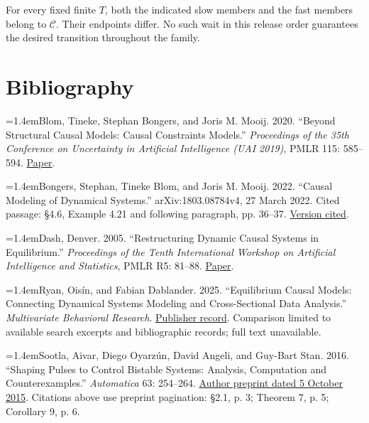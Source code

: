 For every fixed finite \(T\), both the indicated slow members and the fast members belong to \(\mathcal C\). Their endpoints differ. No such wait in this release order guarantees the desired transition throughout the family.

\enlargethispage{2\baselineskip}\section*{Bibliography}\begingroup\fontsize{10}{13}\selectfont\setlength{\parindent}{0pt}\setlength{\parskip}{0.55em}\raggedright

\hypertarget{ref:blom2020}{}\hangindent=1.4em\noindent Blom, Tineke, Stephan Bongers, and Joris M. Mooij. 2020. “Beyond Structural Causal Models: Causal Constraints Models.” \emph{Proceedings of the 35th Conference on Uncertainty in Artificial Intelligence (UAI 2019)}, PMLR 115: 585–594. \href{https://proceedings.mlr.press/v115/blom20a/blom20a.pdf}{Paper}.

\hypertarget{ref:bongers2022}{}\hangindent=1.4em\noindent Bongers, Stephan, Tineke Blom, and Joris M. Mooij. 2022. “Causal Modeling of Dynamical Systems.” arXiv:1803.08784v4, 27 March 2022. Cited passage: §4.6, Example 4.21 and following paragraph, pp. 36–37. \href{https://staff.fnwi.uva.nl/j.m.mooij/articles/1803.08784v4.pdf}{Version cited}.

\hypertarget{ref:dash2005}{}\hangindent=1.4em\noindent Dash, Denver. 2005. “Restructuring Dynamic Causal Systems in Equilibrium.” \emph{Proceedings of the Tenth International Workshop on Artificial Intelligence and Statistics}, PMLR R5: 81–88. \href{https://proceedings.mlr.press/r5/dash05a/dash05a.pdf}{Paper}.

\hypertarget{ref:ryan2025}{}\hangindent=1.4em\noindent Ryan, Oisín, and Fabian Dablander. 2025. “Equilibrium Causal Models: Connecting Dynamical Systems Modeling and Cross-Sectional Data Analysis.” \emph{Multivariate Behavioral Research}. \href{https://doi.org/10.1080/00273171.2025.2522733}{Publisher record}. Comparison limited to available search excerpts and bibliographic records; full text unavailable.

\hypertarget{ref:sootla2016}{}\hangindent=1.4em\noindent Sootla, Aivar, Diego Oyarzún, David Angeli, and Guy-Bart Stan. 2016. “Shaping Pulses to Control Bistable Systems: Analysis, Computation and Counterexamples.” \emph{Automatica} 63: 254–264. \href{https://orbi.uliege.be/bitstream/2268/191987/1/border_final.pdf}{Author preprint dated 5 October 2015}. Citations above use preprint pagination: §2.1, p. 3; Theorem 7, p. 5; Corollary 9, p. 6.

